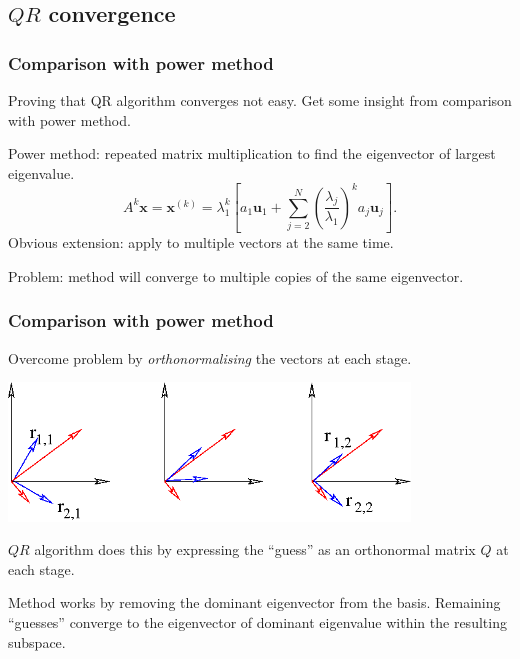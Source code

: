 \documentclass{beamer}
\begin{document}
\subsection{\texorpdfstring{$QR$ convergence}{QR convergence}}

\begin{frame}
  \frametitle{Comparison with power method}

  Proving that QR algorithm converges not easy. Get some insight from
  comparison with power method.  \pause

  \vspace{1ex}

  Power method: repeated matrix multiplication to find the eigenvector
  of largest eigenvalue.
  \begin{equation*}
    A^k\boldsymbol{x} = \boldsymbol{x}^{(k)} = \lambda_1^k\left[ a_1\boldsymbol{u}_1 +
      \sum_{j=2}^{N}\left(\frac{\lambda_j}{\lambda_1}\right)^ka_j\boldsymbol{u}_j   \right].
  \end{equation*}  \pause
  Obvious extension: apply to multiple vectors
  at the same time.
  \pause

  \vspace{1ex}

  Problem: method will converge to multiple copies of the same
  eigenvector.
\end{frame}

\begin{frame}
  \frametitle{Comparison with power method}

  Overcome problem by \emph{orthonormalising} the vectors at each stage.

  {\centering \includegraphics[width=0.8\textwidth]{figures/QR}}
  \pause

  \vspace{1ex}

  $QR$ algorithm does this by expressing the ``guess'' as an
  orthonormal matrix $Q$ at each stage.  \pause

  \vspace{1ex}

  Method works by removing the dominant eigenvector from the
  basis. \pause Remaining ``guesses''  converge to the
  eigenvector of dominant eigenvalue within the resulting subspace.

\end{frame}
\end{document}
